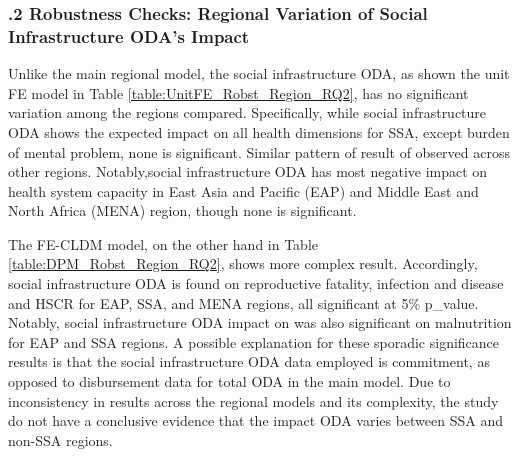 \subsubsection*{.2 Robustness Checks: Regional Variation of Social Infrastructure ODA's Impact}

Unlike the main regional model, the social infrastructure ODA, as shown the unit FE model in Table \ref{table:UnitFE_Robst_Region_RQ2}, has no significant variation among the regions compared. Specifically, while social infrastructure ODA shows the expected impact on all health dimensions for SSA, except burden of mental problem, none is significant. Similar pattern of result of observed across other regions. Notably,social infrastructure ODA has most negative impact on health system capacity in East Asia and Pacific (EAP) and  Middle East and North Africa (MENA) region, though none is significant.  

The FE-CLDM model, on the other hand in Table \ref{table:DPM_Robst_Region_RQ2}, shows more complex result. Accordingly, social infrastructure ODA is found on reproductive fatality, infection and disease and HSCR for EAP, SSA, and MENA regions, all significant at 5\% p\_value. Notably, social infrastructure ODA impact on was also significant on malnutrition for EAP and SSA regions. A possible explanation for these sporadic significance results is that the social infrastructure ODA data employed is commitment, as opposed to disbursement data for total ODA in the main model. Due to inconsistency in results across the regional models and its complexity, the study do not have a conclusive evidence that the impact ODA varies between SSA and non-SSA regions.    



%

